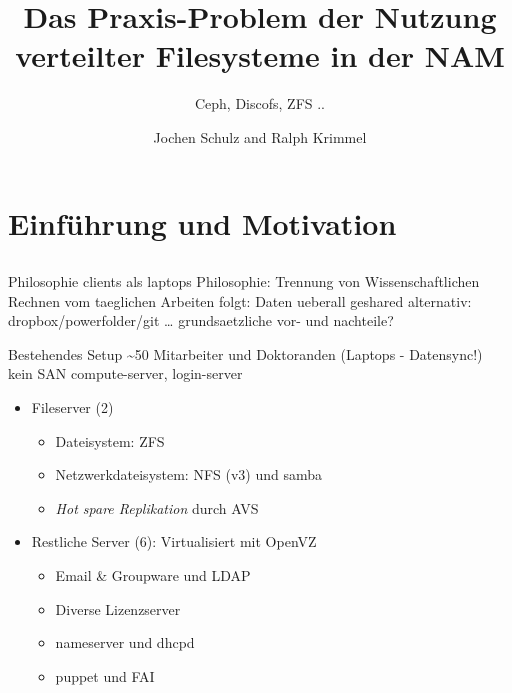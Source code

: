 \documentclass[hyperref={xetex}]{beamer}
\title{Das Praxis-Problem der Nutzung verteilter Filesysteme in der NAM}
\subtitle{ Ceph, Discofs, ZFS ..}
\author{Jochen Schulz and Ralph Krimmel}
\begin{document}
	\nocite{*} 
	\begin{frame}
		\titlepage
	\end{frame}

	\begin{frame}
		\tableofcontents
	\end{frame}


\section{Einf\"uhrung und Motivation}
\subsection*{}

\begin{frame}{Philosophie
    clients als laptops}
    Philosophie: Trennung von Wissenschaftlichen Rechnen vom taeglichen Arbeiten
    folgt: Daten ueberall geshared
    alternativ: dropbox/powerfolder/git \ldots 
    grundsaetzliche vor- und nachteile?
\end{frame}


\begin{frame}{Bestehendes Setup}
	\textasciitilde 50 Mitarbeiter und Doktoranden (Laptops - Datensync!)
    kein SAN
    compute-server, login-server
	\begin{itemize}
		\item Fileserver (2)
			\begin{itemize}
				\item Dateisystem: ZFS 
				\item Netzwerkdateisystem: NFS (v3) und samba
                \item \textsl{Hot spare Replikation} durch AVS
			\end{itemize} 
		\item <2> Restliche Server (6): Virtualisiert mit OpenVZ
	\begin{itemize}
		\item Email \& Groupware und LDAP
		\item Diverse Lizenzserver
		\item nameserver und dhcpd
        \item puppet und FAI    
	\end{itemize}
	\end{itemize}
\end{frame}
\end{document}
